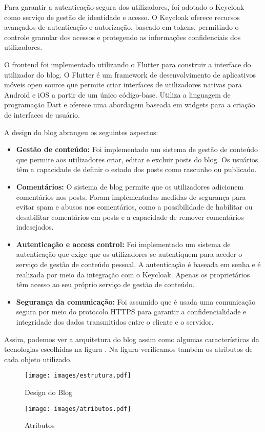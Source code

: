 \documentclass[conference]{IEEEtran}
\begin{document}
Para garantir a autenticação segura dos utilizadores, foi adotado o Keycloak como serviço de gestão de identidade e acesso. O Keycloak oferece recursos avançados de autenticação e autorização, baseado em tokens, permitindo o controle granular dos acessos e protegendo as informações confidenciais dos utilizadores.

O frontend foi implementado utilizando o Flutter para construir a interface do utilizador do blog. O Flutter é um framework de desenvolvimento de aplicativos móveis open source que permite criar interfaces de utilizadores nativas para Android e iOS a partir de um único código-base. Utiliza a linguagem de programação Dart e oferece uma abordagem baseada em widgets para a criação de interfaces de usuário.

A design do blog abrangeu os seguintes aspectos:
\begin{itemize}
    \item \textbf{Gestão de conteúdo:} Foi implementado um sistema de gestão de conteúdo que permite aos utilizadores criar, editar e excluir posts do blog. Os usuários têm a capacidade de definir o estado dos posts como rascunho ou publicado.
    \item \textbf{Comentários:} O sistema de blog permite que os utilizadores adicionem comentários nos posts. Foram implementadas medidas de segurança para evitar spam e abusos nos comentários, como a possibilidade de habilitar ou desabilitar comentários em posts e a capacidade de remover comentários indesejados.
    \item \textbf{Autenticação e access control:} Foi implementado um sistema de autenticação que exige que os utilizadores se autentiquem para aceder o serviço de gestão de conteúdo pessoal. A autenticação é baseada em senha e é realizada por meio da integração com o Keycloak. Apenas os proprietários têm acesso ao seu próprio serviço de gestão de conteúdo.
    \item \textbf{Segurança da comunicação:} Foi assumido que é usada uma comunicação segura por meio do protocolo HTTPS para garantir a confidencialidade e integridade dos dados transmitidos entre o cliente e o servidor.    
\end{itemize}


Assim, podemos ver a arquitetura do blog assim como algumas características da tecnologias escolhidas na figura \cite{1}. Na figura \cite{2} verificamos também os atributos de cada objeto utilizado.
\begin{figure}[H]
    \centering
    \texttt{[image: images/estrutura.pdf]}
    \caption{Design do Blog \cite{1}}
    \label{fig:Design do Blog}
\end{figure}
\begin{figure}[H]
    \centering
    \texttt{[image: images/atributos.pdf]}
    \caption{Atributos \cite{2}}
    \label{fig:Atributos}
\end{figure}
\end{document}
